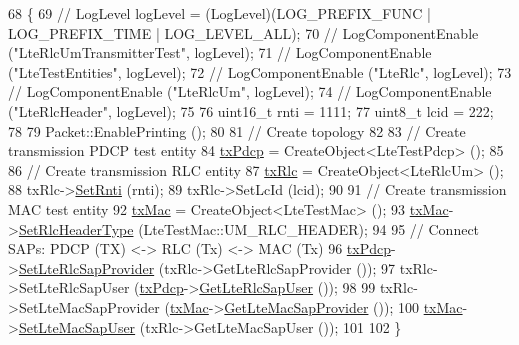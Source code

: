 \begin{DoxyCode}
68 \{
69   \textcolor{comment}{// LogLevel logLevel = (LogLevel)(LOG\_PREFIX\_FUNC | LOG\_PREFIX\_TIME | LOG\_LEVEL\_ALL);}
70   \textcolor{comment}{// LogComponentEnable ("LteRlcUmTransmitterTest", logLevel);}
71   \textcolor{comment}{// LogComponentEnable ("LteTestEntities", logLevel);}
72   \textcolor{comment}{// LogComponentEnable ("LteRlc", logLevel);}
73   \textcolor{comment}{// LogComponentEnable ("LteRlcUm", logLevel);}
74   \textcolor{comment}{// LogComponentEnable ("LteRlcHeader", logLevel);}
75 
76   uint16\_t rnti = 1111;
77   uint8\_t lcid = 222;
78 
79   Packet::EnablePrinting ();
80 
81   \textcolor{comment}{// Create topology}
82 
83   \textcolor{comment}{// Create transmission PDCP test entity}
84   \hyperlink{classLteRlcUmTransmitterTestCase_a46b95c0ea6f9904e977e73b766abc9b5}{txPdcp} = CreateObject<LteTestPdcp> ();
85 
86   \textcolor{comment}{// Create transmission RLC entity}
87   \hyperlink{classLteRlcUmTransmitterTestCase_a7c000ff01d3966105aef18401bed9bfe}{txRlc} = CreateObject<LteRlcUm> ();
88   txRlc->\hyperlink{classns3_1_1LteRlc_aaa523544e1f9a29104a343333741f498}{SetRnti} (rnti);
89   txRlc->SetLcId (lcid);
90 
91   \textcolor{comment}{// Create transmission MAC test entity}
92   \hyperlink{classLteRlcUmTransmitterTestCase_a9cd57d7805fdc18d579e28045b50436c}{txMac} = CreateObject<LteTestMac> ();
93   \hyperlink{classLteRlcUmTransmitterTestCase_a9cd57d7805fdc18d579e28045b50436c}{txMac}->\hyperlink{classns3_1_1LteTestMac_acbe465027c32200d31d1785419993ddd}{SetRlcHeaderType} (LteTestMac::UM\_RLC\_HEADER);
94 
95   \textcolor{comment}{// Connect SAPs: PDCP (TX) <-> RLC (Tx) <-> MAC (Tx)}
96   \hyperlink{classLteRlcUmTransmitterTestCase_a46b95c0ea6f9904e977e73b766abc9b5}{txPdcp}->\hyperlink{classns3_1_1LteTestPdcp_a47f07d4c2e6e1b06d5d5103c7678cb06}{SetLteRlcSapProvider} (txRlc->GetLteRlcSapProvider ());
97   txRlc->SetLteRlcSapUser (\hyperlink{classLteRlcUmTransmitterTestCase_a46b95c0ea6f9904e977e73b766abc9b5}{txPdcp}->\hyperlink{classns3_1_1LteTestPdcp_a3893283fd40b527e935ae025ac1a813e}{GetLteRlcSapUser} ());
98 
99   txRlc->SetLteMacSapProvider (\hyperlink{classLteRlcUmTransmitterTestCase_a9cd57d7805fdc18d579e28045b50436c}{txMac}->\hyperlink{classns3_1_1LteTestMac_aca0bc578effe20c77f51c7a39c8f089e}{GetLteMacSapProvider} ());
100   \hyperlink{classLteRlcUmTransmitterTestCase_a9cd57d7805fdc18d579e28045b50436c}{txMac}->\hyperlink{classns3_1_1LteTestMac_a234317bfc20d9f149bfbd36546a50d4b}{SetLteMacSapUser} (txRlc->GetLteMacSapUser ());
101 
102 \}
\end{DoxyCode}


